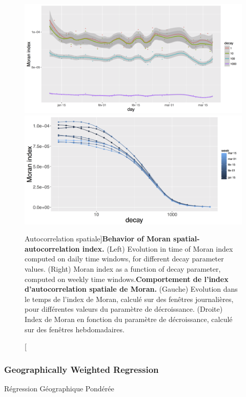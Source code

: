 \begin{figure}
\centering
\includegraphics[width=\textwidth]{Figures/EnergyPrice/moran_days}\\
\includegraphics[width=\textwidth]{Figures/EnergyPrice/moran_decay_weeks}
\caption[Moran spatial-autocorrelation index][Autocorrelation spatiale]{\textbf{Behavior of Moran spatial-autocorrelation index.} (Left) Evolution in time of Moran index computed on daily time windows, for different decay parameter values. (Right) Moran index as a function of decay parameter, computed on weekly time windows.}{\textbf{Comportement de l'index d'autocorrelation spatiale de Moran.} (Gauche) Evolution dans le temps de l'index de Moran, calculé sur des fenêtres journalières, pour différentes valeurs du paramètre de décroissance. (Droite) Index de Moran en fonction du paramètre de décroissance, calculé sur des fenêtres hebdomadaires.}
\label{fig:moran}
\end{figure}

\subsubsection{Geographically Weighted Regression}{Régression Géographique Pondérée}


